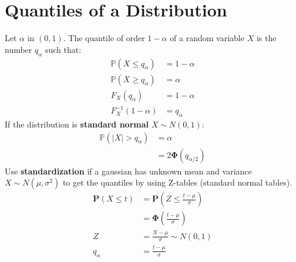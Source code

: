 \section{Quantiles of a Distribution}

Let $\alpha$ in $(0,1)$. The quantile of order $1 - \alpha$ of a random variable $X$ is the number $q_{\alpha}$ such that:\\
\begin{align*}
\displaystyle \mathbb{P}\left(X\leq q_{\alpha }\right)& = 1-\alpha\\
\mathbb{P}(X \geq q_{\alpha })& = \alpha\\
F_X(q_{\alpha})& = 1 - \alpha\\
F^{-1}_{X}(1-\alpha)&= q_{\alpha }
\end{align*}
If the distribution is \textbf{standard normal} $X \sim N(0,1)$:\\
\begin{align*}
\mathbb{P}(|X| > q_{\alpha})& = \alpha\\
& = 2\mathbf{\Phi}(q_{\alpha/2})
\end{align*}
Use \textbf{standardization} if a gaussian has unknown mean and variance $X \sim N(\mu,\sigma^2)$ to get the quantiles by using Z-tables (standard normal tables).\\

\begin{align*}
\mathbf{P}\left(X\leq t\right)& = \displaystyle \mathbf{P}\left(Z\leq \frac{t-\mu}{\sigma}\right)\\
& = \mathbf{\Phi}\left(\frac{t-\mu}{\sigma}\right)\\
Z &= \frac{X-\mu}{\sigma} \sim N(0,1)\\
q_{\alpha }& = \frac{t-\mu}{\sigma}
\end{align*}